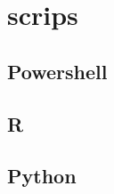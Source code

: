 \section{scrips}\label{apx:code}

\subsection{Powershell}\label{apx:code:datacollect}



%

\subsection{R}\label{apx:code:dataanal}



\subsection{Python}

\label{apx:code:datamod}